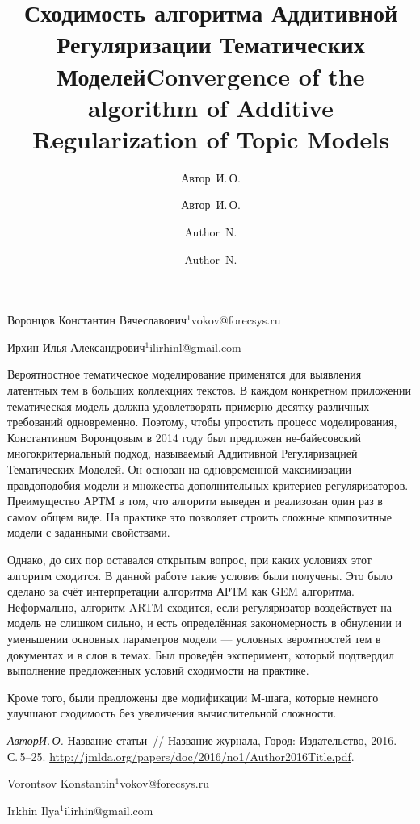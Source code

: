 \documentclass[twoside]{article}
\begin{document}
\title{Сходимость алгоритма Аддитивной Регуляризации Тематических Моделей}
\author{Автор~И.\,О.}{Воронцов Константин Вячеславович$^1$}{vokov@forecsys.ru}
\author{Автор~И.\,О.}{Ирхин Илья Александрович$^{1}$\speaker}{ilirhinl@gmail.com}
\Russian
\maketitle

Вероятностное тематическое моделирование применятся для выявления  латентных тем в больших коллекциях текстов. В каждом конкретном приложении тематическая модель должна удовлетворять примерно десятку различных требований одновременно. Поэтому, чтобы упростить процесс моделирования, Константином Воронцовым в 2014 году был предложен не-байесовский многокритериальный подход, называемый Аддитивной Регуляризацией Тематических Моделей. Он основан на одновременной максимизации правдоподобия модели и множества дополнительных критериев-регуляризаторов. Преимущество АРТМ в том, что алгоритм выведен и реализован один раз в самом общем виде. На практике это позволяет строить сложные композитные модели с заданными свойствами.

Однако, до сих пор оставался открытым вопрос, при каких условиях этот алгоритм сходится. В данной работе такие условия были получены. Это было сделано за счёт интерпретации алгоритма АРТМ как GEM алгоритма. Неформально, алгоритм ARTM сходится, если регуляризатор воздействует на модель не слишком сильно, и есть определённая закономерность в обнулении и уменьшении основных параметров модели --- условных вероятностей тем в документах и в слов в темах. Был проведён эксперимент, который подтвердил выполнение предложенных условий сходимости на практике.

 Кроме того, были предложены две модификации М-шага, которые немного улучшают сходимость без увеличения вычислительной сложности. 

\begin{thebibliography}{1}
    \emph{Автор\;И.\,О.}
    Название статьи~//
    Название журнала,
    Город: Издательство, 2016.~--- С.\,5--25. %
    \url{http://jmlda.org/papers/doc/2016/no1/Author2016Title.pdf}.
\end{thebibliography}


\title{Convergence of the algorithm of Additive Regularization of Topic Models }
\author{Author~N.}{Vorontsov Konstantin$^{1}$}{vokov@forecsys.ru}
\author{Author~N.}{Irkhin Ilya$^{1}$\speaker}{ilirhin@gmail.com}
\English
\maketitle
\end{document}
